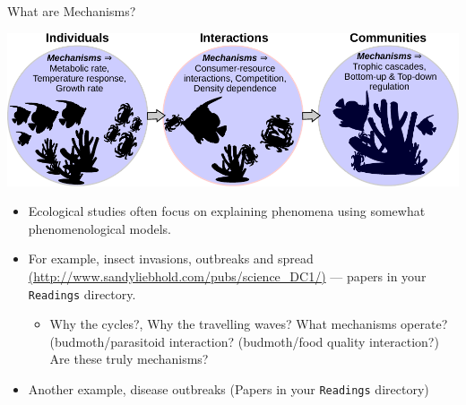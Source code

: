 \documentclass[xcolor=x11names,handout,compress]{beamer}
\renewcommand{\(}{\begin{columns}}
\renewcommand{\)}{\end{columns}}
\newcommand{\<}[1]{\begin{column}{#1}}
\renewcommand{\>}{\end{column}}
\begin{document}
\begin{frame}{What are Mechanisms?}

 \begin{center}
	 \includegraphics[width=.6\textwidth]{Mechanisms.pdf}
 \end{center} 
   
   \begin{itemize}[<+->] \itemsep4pt
			\item Ecological studies often focus on explaining phenomena 
			using somewhat phenomenological models. 
      \item For example, insect invasions, outbreaks and spread {\tiny \url{
      (http://www.sandyliebhold.com/pubs/science_DC1/)}} --- papers in 
      your {\tt Readings} directory.
      \begin{itemize}
				\item Why the cycles?, Why the travelling waves? \pause What 
				mechanisms operate? (budmoth/parasitoid interaction? 
				(budmoth/food quality interaction?) Are these truly mechanisms?
			\end{itemize}
     \item Another example, disease outbreaks (Papers in 
      your {\tt Readings} directory)   
      
      \end{itemize}

\end{frame}
\end{document}
